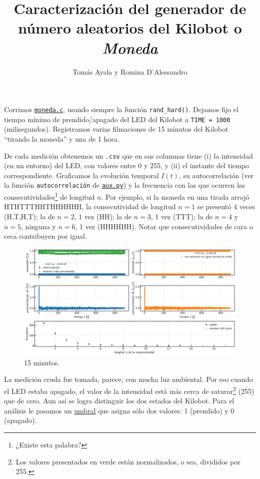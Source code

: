 \documentclass[a4paper]{article}
\title{\large{\textbf{Caracterización del generador de número aleatorios del Kilobot o \emph{Moneda}}}}
\author{%
	\normalsize{Tomás Ayala y Romina D'Alessandro}
}
\date{}
\begin{document}
	
\maketitle

Corrimos \href{https://github.com/rldromina/Kilobots/blob/tom/Moneda/moneda.c}{\texttt{moneda.c}}, usando siempre la función \texttt{rand\_hard()}.
Dejamos fijo el tiempo mínimo de prendido/apagado del LED del Kilobot a \texttt{TIME = 1000} (milisegundos).
Registramos varias filmaciones de 15 minutos del Kilobot ``tirando la moneda'' y una de 1 hora.

De cada medición obtenemos un \texttt{.csv} que en sus columnas tiene (i) la intensidad (en un entorno) del LED, con valores entre 0 y 255, y (ii) el instante del tiempo correspondiente. Graficamos la evolución temporal $I(t)$, su autocorrelación (ver la función \texttt{autocorrelación} de \href{https://github.com/rldromina/Kilobots/blob/tom/Moneda/aux.py}{\texttt{aux.py}}) y la frecuencia con las que ocurren las consecutividades\footnote{¿Existe esta palabra?} de longitud $n$. Por ejemplo, si la moneda en una tirada arrojó HTHTTTHHTHHHHHH, la consecutividad de longitud $n=1$ se presentó $4$ veces (H,T,H,T); la de $n=2$, $1$ vez (HH); la de $n=3$, 1 vez (TTT); la de $n=4$ y $n=5$, ninguna y $n=6$, 1 vez (HHHHHH). Notar que consecutividades de cara o ceca contribuyen por igual.

\begin{figure}[!h]
	\centering
	\includegraphics[width=\linewidth]{Resultados/15min_b.png}
	\caption{15 minutos.}
\end{figure}

La medición cruda fue tomada, parece, con mucha luz ambiental. Por eso cuando el LED estaba apagado, el valor de la intensidad está más cerca de saturar\footnote{Los valores presentados en verde están normalizados, o sea, divididos por 255.} (255) que de cero. Aun así se logra distinguir los dos estados del Kilobot. Para el análisis le pasamos un \href{https://github.com/rldromina/Kilobots/blob/tom/Moneda/aux.py}{umbral} que asigna sólo dos valores: 1 (prendido) y 0 (apagado).
\end{document}
